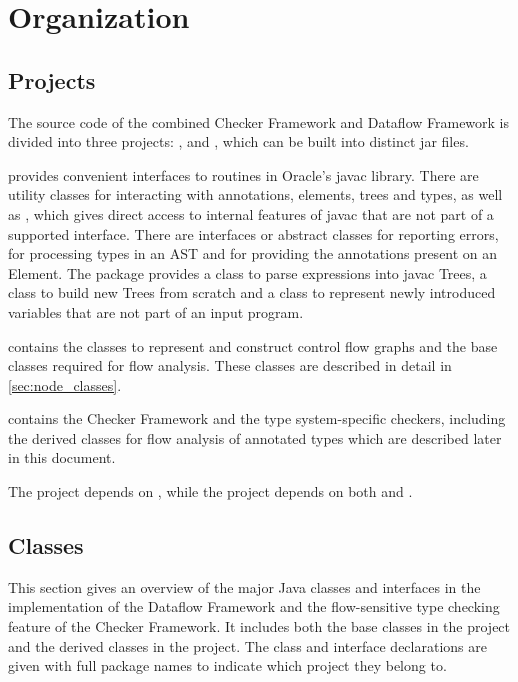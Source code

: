 \section{Organization}

\subsection{Projects}

The source code of the combined Checker Framework and Dataflow Framework is divided into three projects: ,  and , which can be built into distinct jar files. 

 provides convenient interfaces to routines in Oracle's javac library.  There are utility classes for interacting with annotations, elements, trees and types, as well as , which gives direct access to internal features of javac that are not part of a supported interface.  There are interfaces or abstract classes for reporting errors, for processing types in an AST and for providing the annotations present on an Element.  The  package provides a class to parse expressions into javac Trees, a class to build new Trees from scratch and a class to represent newly introduced variables that are not part of an input program.
 
 contains the classes to represent and construct control flow graphs and the base classes required for flow analysis.   These classes are described in detail in \autoref{sec:node_classes}.
  
 contains the Checker Framework and the type system-specific checkers, including the derived classes for flow analysis of annotated types which are described later in this document.

The  project depends on , while the  project depends on both  and .

\subsection{Classes}

This section gives an overview of the major Java classes and interfaces in the implementation of the Dataflow Framework and the flow-sensitive type checking feature of the Checker Framework.  It includes both the base classes in the  project and the derived classes in the  project.  The class and interface declarations are given with full package names to indicate which project they belong to.

